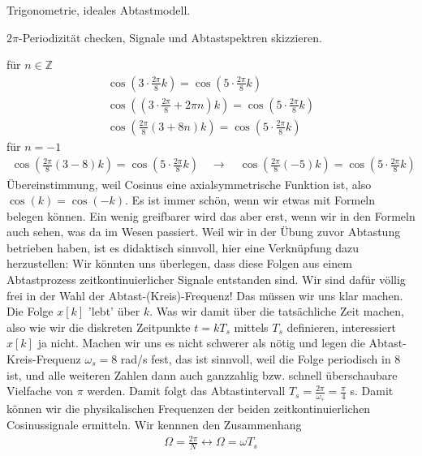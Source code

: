 \begin{Werkzeug}
Trigonometrie, ideales Abtastmodell.
\end{Werkzeug}
\begin{Ansatz}
$2\pi$-Periodizität checken, Signale und Abtastspektren skizzieren.
\end{Ansatz}
\begin{ExCalc}
für $n\in\mathbb{Z}$
\begin{align}
\cos(3\cdot\frac{2\pi}{8}k) = \cos(5\cdot\frac{2\pi}{8}k)\\
\cos\left(\left(3\cdot\frac{2\pi}{8} + 2\pi n\right)k\right) = \cos(5\cdot\frac{2\pi}{8}k)\\
\cos\left(\frac{2\pi}{8}\left(3 + 8 n\right)k\right) = \cos(5\cdot\frac{2\pi}{8}k)
\end{align}
für $n=-1$
\begin{align}
\cos\left(\frac{2\pi}{8}\left(3 - 8\right)k\right) = \cos(5\cdot\frac{2\pi}{8}k)
\quad
\rightarrow
\quad
\cos\left(\frac{2\pi}{8}\left(-5\right)k\right) = \cos(5\cdot\frac{2\pi}{8}k)
\end{align}
Übereinstimmung, weil Cosinus eine axialsymmetrische Funktion ist, also
$\cos(k) = \cos(-k)$.
%
Es ist immer schön, wenn wir etwas mit Formeln belegen können.
%
Ein wenig greifbarer wird das aber erst, wenn wir in den Formeln auch sehen,
was da im Wesen passiert.
%
Weil wir in der Übung zuvor Abtastung betrieben haben, ist es didaktisch sinnvoll,
hier eine Verknüpfung dazu herzustellen: Wir könnten uns überlegen, dass diese
Folgen aus einem Abtastprozess zeitkontinuierlicher Signale entstanden
sind.
%
Wir sind dafür völlig frei in der Wahl der Abtast-(Kreis)-Frequenz! Das
müssen wir uns klar machen. Die Folge $x[k]$ 'lebt' über $k$. Was wir damit
über die tatsächliche Zeit machen, also wie wir die diskreten Zeitpunkte
$t=k T_s$ mittels $T_s$ definieren, interessiert $x[k]$ ja nicht.
%
Machen wir uns es nicht schwerer als nötig und legen die Abtast-Kreis-Frequenz
$\omega_s=8$ rad/s fest, das ist sinnvoll, weil die Folge periodisch in 8 ist,
und alle weiteren Zahlen dann auch ganzzahlig bzw. schnell überschaubare
Vielfache von $\pi$ werden.
%
Damit folgt das Abtastintervall
$T_s = \frac{2\pi}{\omega_s}=\frac{\pi}{4}$ s.
%
Damit können wir die physikalischen Frequenzen der beiden zeitkontinuierlichen
Cosinussignale ermitteln. Wir kennnen den Zusammenhang
\begin{align}
\Omega = \frac{2\pi}{N} \leftrightarrow \Omega = \omega T_s

\end{align}
\end{ExCalc}
